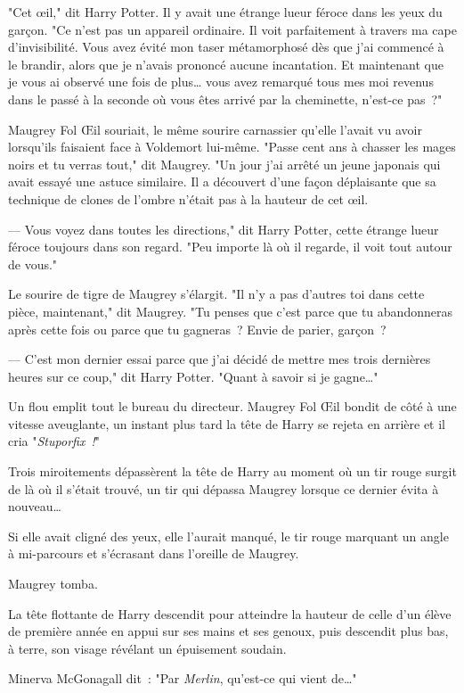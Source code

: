 "Cet œil," dit Harry Potter. Il y avait une étrange lueur féroce dans les yeux du garçon. "Ce n'est pas un appareil ordinaire. Il voit parfaitement à travers ma cape d'invisibilité. Vous avez évité mon taser métamorphosé dès que j'ai commencé à le brandir, alors que je n'avais prononcé aucune incantation. Et maintenant que je vous ai observé une fois de plus… vous avez remarqué tous mes moi revenus dans le passé à la seconde où vous êtes arrivé par la cheminette, n'est-ce pas~?"

Maugrey Fol Œil souriait, le même sourire carnassier qu'elle l'avait vu avoir lorsqu'ils faisaient face à Voldemort lui-même. "Passe cent ans à chasser les mages noirs et tu verras tout," dit Maugrey. "Un jour j'ai arrêté un jeune japonais qui avait essayé une astuce similaire. Il a découvert d'une façon déplaisante que sa technique de clones de l'ombre n'était pas à la hauteur de cet œil.

--- Vous voyez dans toutes les directions," dit Harry Potter, cette étrange lueur féroce toujours dans son regard. "Peu importe là où il regarde, il voit tout autour de vous."

Le sourire de tigre de Maugrey s'élargit. "Il n'y a pas d'autres toi dans cette pièce, maintenant," dit Maugrey. "Tu penses que c'est parce que tu abandonneras après cette fois ou parce que tu gagneras~? Envie de parier, garçon~?

--- C'est mon dernier essai parce que j'ai décidé de mettre mes trois dernières heures sur ce coup," dit Harry Potter. "Quant à savoir si je gagne…"

Un flou emplit tout le bureau du directeur. Maugrey Fol Œil bondit de côté à une vitesse aveuglante, un instant plus tard la tête de Harry se rejeta en arrière et il cria "\emph{Stuporfix~!}"

Trois miroitements dépassèrent la tête de Harry au moment où un tir rouge surgit de là où il s'était trouvé, un tir qui dépassa Maugrey lorsque ce dernier évita à nouveau…

Si elle avait cligné des yeux, elle l'aurait manqué, le tir rouge marquant un angle à mi-parcours et s'écrasant dans l'oreille de Maugrey.

Maugrey tomba.

La tête flottante de Harry descendit pour atteindre la hauteur de celle d'un élève de première année en appui sur ses mains et ses genoux, puis descendit plus bas, à terre, son visage révélant un épuisement soudain.

Minerva McGonagall dit~: "Par \emph{Merlin}, qu'est-ce qui vient de…"

